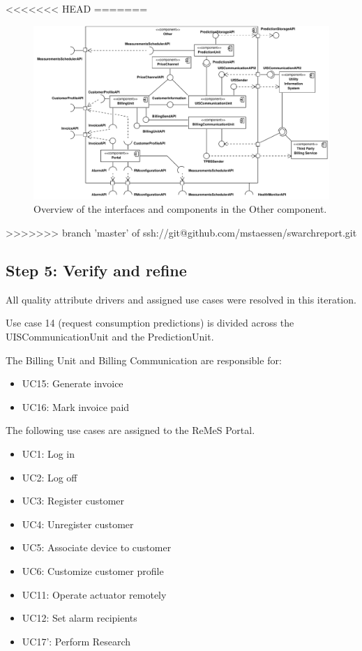 <<<<<<< HEAD
=======
\begin{figure}[H]
	\begin{centering}
		\includegraphics[width=\textwidth]{figs/add-it10-interfaces.pdf}
		\caption{Overview of the interfaces and components in the Other component.}
		\label{fig:it10/interfaces}
	\end{centering}
\end{figure}
>>>>>>> branch 'master' of ssh://git@github.com/mstaessen/swarchreport.git

\subsection{Step 5: Verify and refine}
\label{add:it10/verification}

\npar All quality attribute drivers and assigned use cases were resolved in
this iteration. 

\npar Use case 14 (request consumption predictions) is divided across the
UISCommunicationUnit and the PredictionUnit.

\npar The Billing Unit and Billing Communication are responsible for:

\begin{itemize}
    \item UC15: Generate invoice
    \item UC16: Mark invoice paid
\end{itemize}

\npar The following use cases are assigned to the ReMeS Portal.

\begin{itemize}
	\item UC1: Log in
	\item UC2: Log off
	\item UC3: Register customer
	\item UC4: Unregister customer
	\item UC5: Associate device to customer
	\item UC6: Customize customer profile
	\item UC11: Operate actuator remotely
	\item UC12: Set alarm recipients
	\item UC17': Perform Research
\end{itemize}
